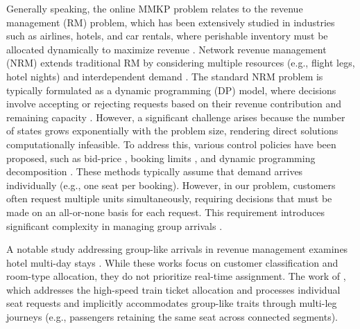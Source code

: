 Generally speaking, the online MMKP problem relates to the revenue management (RM) problem, which has been extensively studied in industries such as airlines, hotels, and car rentals, where perishable inventory must be allocated dynamically to maximize revenue \citep{van2005introduction}. Network revenue management (NRM) extends traditional RM by considering multiple resources (e.g., flight legs, hotel nights) and interdependent demand \citep{williamson1992airline}. The standard NRM problem is typically formulated as a dynamic programming (DP) model, where decisions involve accepting or rejecting requests based on their revenue contribution and remaining capacity \citep{talluri1998analysis}. However, a significant challenge arises because the number of states grows exponentially with the problem size, rendering direct solutions computationally infeasible. To address this, various control policies have been proposed, such as bid-price \citep{adelman2007dynamic, bertsimas2003revenue}, booking limits \citep{gallego1997multiproduct}, and dynamic programming decomposition \citep{talluri2006theory, liu2008choice}. These methods typically assume that demand arrives individually (e.g., one seat per booking). However, in our problem, customers often request multiple units simultaneously, requiring decisions that must be made on an all-or-none basis for each request. This requirement introduces significant complexity in managing group arrivals \citep{talluri2006theory}.


A notable study addressing group-like arrivals in revenue management examines hotel multi-day stays \citep{bitran1995application, goldman2002models, aydin2018decomposition}. While these works focus on customer classification and room-type allocation, they do not prioritize real-time assignment. The work of \cite{zhu2023assign}, which addresses the high-speed train ticket allocation and processes individual seat requests and implicitly accommodates group-like traits through multi-leg journeys (e.g., passengers retaining the same seat across connected segments).

